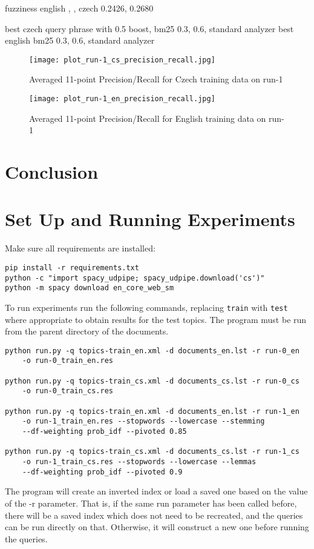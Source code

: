 \documentclass[a4paper]{article}
\begin{document}
fuzziness english , , czech 0.2426, 0.2680

best czech query phrase with 0.5 boost, bm25 0.3, 0.6, standard analyzer
best english bm25 0.3, 0.6, standard analyzer

\begin{figure}[htpb]
	\centering
	\texttt{[image: plot\_run-1\_cs\_precision\_recall.jpg]}
	\caption{Averaged 11-point Precision/Recall for Czech training data on run-1}
	\label{fig:cs_train_run_1}
\end{figure}

\begin{figure}[htpb]
	\centering
	\texttt{[image: plot\_run-1\_en\_precision\_recall.jpg]}
	\caption{Averaged 11-point Precision/Recall for English training data on run-1}
	\label{fig:en_train_run_1}
\end{figure}

\section{Conclusion}

\printbibliography

\newpage

\appendix

\section{Set Up and Running Experiments}

Make sure all requirements are installed:
\begin{verbatim}
pip install -r requirements.txt
python -c "import spacy_udpipe; spacy_udpipe.download('cs')"
python -m spacy download en_core_web_sm
\end{verbatim}

To run experiments run the following commands, replacing \texttt{train} with
\texttt{test} where appropriate to obtain results for the test topics.
The program must be run from the parent directory of the documents.
\begin{verbatim}
python run.py -q topics-train_en.xml -d documents_en.lst -r run-0_en
    -o run-0_train_en.res

python run.py -q topics-train_cs.xml -d documents_cs.lst -r run-0_cs
    -o run-0_train_cs.res

python run.py -q topics-train_en.xml -d documents_en.lst -r run-1_en 
    -o run-1_train_en.res --stopwords --lowercase --stemming
    --df-weighting prob_idf --pivoted 0.85

python run.py -q topics-train_cs.xml -d documents_cs.lst -r run-1_cs
    -o run-1_train_cs.res --stopwords --lowercase --lemmas
    --df-weighting prob_idf --pivoted 0.9
\end{verbatim}

The program will create an inverted index or load a saved one based on the value
of the -r parameter.  That is, if the same run parameter has been called before,
there will be a saved index which does not need to be recreated, and the queries
can be run directly on that. Otherwise, it will construct a new one before
running the queries.
\end{document}
